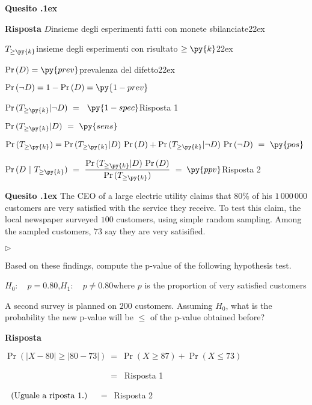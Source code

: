 \documentclass[11pt,twoside,a4paper]{article}
\newcommand{\mylabel}[1]{#1\hfill}
\renewenvironment{itemize}
  {\begin{list}{$\triangleright$}{%
   \setlength{\parskip}{0mm}
   \setlength{\topsep}{.4\baselineskip}
   \setlength{\rightmargin}{0mm}
   \setlength{\listparindent}{0mm}
   \setlength{\itemindent}{0mm}
   \setlength{\labelwidth}{2ex}
   \setlength{\itemsep}{.4\baselineskip}
   \setlength{\parsep}{0mm}
   \setlength{\partopsep}{0mm}
   \setlength{\labelsep}{1ex}
   \setlength{\leftmargin}{\labelwidth+\labelsep}
   \let\makelabel\mylabel}}{%
   \end{list}\vspace*{-1.3mm}}
\newcounter{quesito}
\newenvironment{question}{\addtocounter{quesito}{1}\par\textbf{Quesito \thequesito.\kern1ex}}{\vspace{0.5\parskip}}
\newenvironment{answer}{\par\textbf{Risposta\quad}}{\vspace{\parskip}}
\begin{document}
\begin{question}
\begin{answer}
$D$\hfill insieme degli esperimenti fatti con monete sbilanciate\kern22ex

$T_{\ge\py{k}}$\hfill insieme degli esperimenti con risultato $\ge\py{k}$\kern22ex

$\Pr(D)=\py{prev}$\hfill prevalenza del difetto\kern22ex

$\Pr(\neg D)=1-\Pr(D)=\py{1-prev}$

$\Pr(T_{\ge\py{k}}| \neg D)\ =\kern1ex${\color{blue} $\py{1-spec}$\hfill Risposta 1} 

$\Pr(T_{\ge\py{k}}| D)\ =\ \py{sens}$

$\Pr(T_{\ge\py{k}})=\Pr(T_{\ge\py{k}}|D)\ \Pr(D) + \Pr(T_{\ge\py{k}}|\neg D)\ \Pr(\neg D)\ =\ \py{pos}$

$\displaystyle\Pr(D ~|~T_{\ge\py{k}})\ =\ \frac{\Pr(T_{\ge\py{k}}| D)\ \Pr(D)}{\Pr(T_{\ge\py{k}})}\ =\kern1ex${\color{blue}$\py{ppv}$\hfill Risposta 2}

\end{answer}
\end{question}



\begin{question}
The CEO of a large electric utility claims that $80\%$ of his $1\,000\,000$ customers are very satisfied with the service they receive. To test this claim, the local newspaper surveyed $100$ customers, using simple random sampling. Among the sampled customers, $73$ say they are very satisified. 

\begin{itemize}
\item[1.] Based on these findings, compute the p-value of the following hypothesis test.

$H_0:\quad p = 0.80$,\qquad $H_1:\quad p \neq 0.80$\hfill  where $p$ is the proportion of very satisfied customers

\item[2.] A second survey is planned on $200$ customers. Assuming $H_0$, what is the probability the new p-value will be $\le$ of the p-value obtained before?
\end{itemize}
\begin{answer}

$\Pr(|X-80|\ge|80-73|)
\ =\ 
\Pr(X\ge 87) + \Pr(X\le 73) $

$\phantom{\Pr(|X-80|\ge|80-73|)}
\ =\ $
{\color{blue}{\tt 1 - bimom.cdf(86, 100, 0.8) + bimom.cdf(72, 100, 0.8)}\hfill Risposta 1}

$\phantom{\Pr(|X-80|\ge|80-73|)}\llap{(Uguale a riposta 1.)\quad}
\ =\ $
{\color{blue}{\tt 1 - bimom.cdf(86, 100, 0.8) + bimom.cdf(72, 100, 0.8)} \hfill Risposta 2}


\end{answer}
\end{question}
\vfill
\hrulefill
\end{document}

